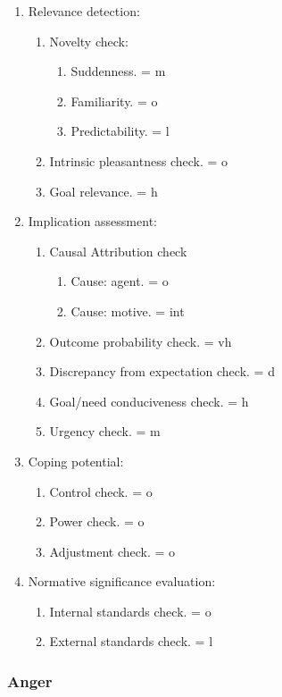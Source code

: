 \begin{enumerate}
\item  Relevance detection:
\begin{enumerate}
\item  Novelty check:
\begin{enumerate}
\item  Suddenness. = m
\item  Familiarity. = o
\item  Predictability. = l
\end{enumerate}
\item  Intrinsic pleasantness check. = o
\item  Goal relevance. = h
\end{enumerate}
\item  Implication assessment:
\begin{enumerate}
\item  Causal Attribution check
\begin{enumerate}
\item  Cause: agent. = o
\item  Cause: motive. = int
\end{enumerate}
\item  Outcome probability check. = vh
\item  Discrepancy from expectation check. = d
\item  Goal/need conduciveness check. = h
\item  Urgency check. = m
\end{enumerate}
\item  Coping potential:
\begin{enumerate}
\item  Control check. = o
\item  Power check. = o
\item  Adjustment check. = o
\end{enumerate}
\item  Normative significance evaluation:
\begin{enumerate}
\item  Internal standards check. = o
\item  External standards check. = l
\end{enumerate}
\end{enumerate}

\subsubsection{Anger}

